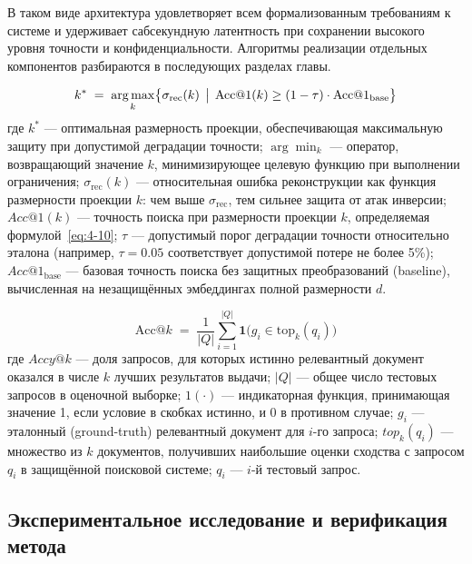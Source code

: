 \documentclass[a4paper, 12pt, oneside, openany]{article}
\begin{document}
В таком виде архитектура удовлетворяет всем формализованным требованиям к системе и удерживает сабсекундную латентность при сохранении высокого уровня точности и конфиденциальности. Алгоритмы реализации отдельных компонентов разбираются в последующих разделах главы.

\begin{equation}
	k^{*} \;=\; \operatorname*{arg\,max}_{k} \bigl\{ \sigma_{\mathrm{rec}}(k) \,\bigm|\, \mathrm{Acc}@1(k) \geq (1 - \tau) \cdot \mathrm{Acc}@1_{\mathrm{base}} \bigr\}
	\label{eq:4-9}
\end{equation}
где \(k^{*}\) --- оптимальная размерность проекции, обеспечивающая максимальную защиту при допустимой деградации точности; \(\arg\min_{k}\) --- оператор, возвращающий значение \(k\), минимизирующее целевую функцию при выполнении ограничения; \(\sigma_{\mathrm{rec}}(k)\) --- относительная ошибка реконструкции как функция размерности проекции \(k\): чем выше \(\sigma_{\mathrm{rec}}\), тем сильнее защита от атак инверсии; \(Acc@1(k)\) --- точность поиска при размерности проекции \(k\), определяемая формулой~\eqref{eq:4-10}; \(\tau\) --- допустимый порог деградации точности относительно эталона (например, \(\tau = 0.05\) соответствует допустимой потере не более 5\%); \({Acc@1}_{\mathrm{base}}\) --- базовая точность поиска без защитных преобразований (baseline), вычисленная на незащищённых эмбеддингах полной размерности \(d\).

\begin{equation}
	\mathrm{Acc}@k \;=\; \frac{1}{|Q|} \sum_{i = 1}^{|Q|} \mathbf{1}\!\bigl( g_{i} \in \mathrm{top}_{k}(q_{i}) \bigr)
	\label{eq:4-10}
\end{equation}
где \(Accy@k\) --- доля запросов, для которых истинно релевантный документ оказался в числе \(k\) лучших результатов выдачи; \(|Q|\) --- общее число тестовых запросов в оценочной выборке; \(1( \cdot )\) --- индикаторная функция, принимающая значение 1, если условие в скобках истинно, и 0 в противном случае; \(g_{i}\) --- эталонный (ground-truth) релевантный документ для \(i\)-го запроса; \(top_{k}\left( q_{i} \right)\) --- множество из \(k\) документов, получивших наибольшие оценки сходства с запросом \(q_{i}\) в защищённой поисковой системе; \(q_{i}\) --- \(i\)-й тестовый запрос.

\subsection{Экспериментальное исследование и верификация метода}\label{subsec:experiments}
\end{document}

